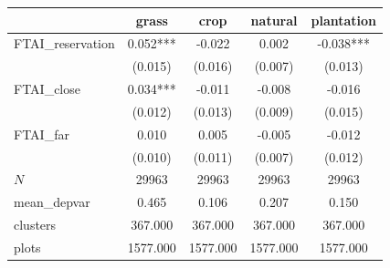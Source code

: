 {
\def\sym#1{\ifmmode^{#1}\else\(^{#1}\)\fi}
\begin{tabular}{l*{4}{c}}
\toprule
          &\multicolumn{1}{c}{grass}&\multicolumn{1}{c}{crop}&\multicolumn{1}{c}{natural}&\multicolumn{1}{c}{plantation}\\
\midrule
FTAI\_reservation&    0.052***&   -0.022   &    0.002   &   -0.038***\\
          &  (0.015)   &  (0.016)   &  (0.007)   &  (0.013)   \\
\addlinespace
FTAI\_close&    0.034***&   -0.011   &   -0.008   &   -0.016   \\
          &  (0.012)   &  (0.013)   &  (0.009)   &  (0.015)   \\
\addlinespace
FTAI\_far  &    0.010   &    0.005   &   -0.005   &   -0.012   \\
          &  (0.010)   &  (0.011)   &  (0.007)   &  (0.012)   \\
\midrule
\(N\)     &    29963   &    29963   &    29963   &    29963   \\
mean\_depvar&    0.465   &    0.106   &    0.207   &    0.150   \\
clusters  &  367.000   &  367.000   &  367.000   &  367.000   \\
plots     & 1577.000   & 1577.000   & 1577.000   & 1577.000   \\
\bottomrule
\end{tabular}
}
